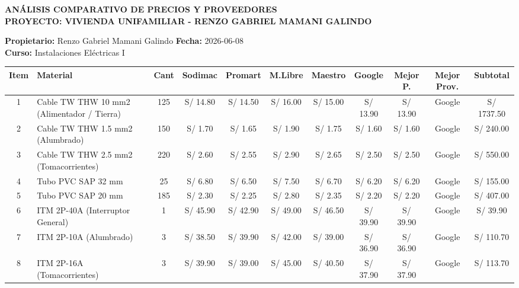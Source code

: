 \documentclass[11pt,a4paper]{article}
\begin{document}
\begin{landscape}
\begin{center}
    {\LARGE\bfseries\color{navyblue} ANÁLISIS COMPARATIVO DE PRECIOS Y PROVEEDORES}\\[0.2cm]
    {\large\bfseries PROYECTO: VIVIENDA UNIFAMILIAR - RENZO GABRIEL MAMANI GALINDO}
\end{center}

\vspace{0.4cm}
\textbf{Propietario:} Renzo Gabriel Mamani Galindo \hfill \textbf{Fecha:} 2026-06-08 \\
\textbf{Curso:} Instalaciones Eléctricas I  \\

\vspace{0.4cm}

\begin{table}[H]
\centering
\begin{scriptsize}
\begin{tabularx}{1.38\textwidth}{c X c c c c c c c c c}
\toprule
\textbf{Item} & \textbf{Material} & \textbf{Cant} & \textbf{Sodimac} & \textbf{Promart} & \textbf{M.Libre} & \textbf{Maestro} & \textbf{Google} & \textbf{Mejor P.} & \textbf{Mejor Prov.} & \textbf{Subtotal} \\
\midrule
1 & Cable TW THW 10 mm2 (Alimentador / Tierra) & 125 & S/ 14.80 & S/ 14.50 & S/ 16.00 & S/ 15.00 & S/ 13.90 & S/ 13.90 & Google & S/ 1737.50 \\
2 & Cable TW THW 1.5 mm2 (Alumbrado) & 150 & S/ 1.70 & S/ 1.65 & S/ 1.90 & S/ 1.75 & S/ 1.60 & S/ 1.60 & Google & S/ 240.00 \\
3 & Cable TW THW 2.5 mm2 (Tomacorrientes) & 220 & S/ 2.60 & S/ 2.55 & S/ 2.90 & S/ 2.65 & S/ 2.50 & S/ 2.50 & Google & S/ 550.00 \\
4 & Tubo PVC SAP 32 mm & 25 & S/ 6.80 & S/ 6.50 & S/ 7.50 & S/ 6.70 & S/ 6.20 & S/ 6.20 & Google & S/ 155.00 \\
5 & Tubo PVC SAP 20 mm & 185 & S/ 2.30 & S/ 2.25 & S/ 2.80 & S/ 2.35 & S/ 2.20 & S/ 2.20 & Google & S/ 407.00 \\
6 & ITM 2P-40A (Interruptor General) & 1 & S/ 45.90 & S/ 42.90 & S/ 49.00 & S/ 46.50 & S/ 39.90 & S/ 39.90 & Google & S/ 39.90 \\
7 & ITM 2P-10A (Alumbrado) & 3 & S/ 38.50 & S/ 39.90 & S/ 42.00 & S/ 39.00 & S/ 36.90 & S/ 36.90 & Google & S/ 110.70 \\
8 & ITM 2P-16A (Tomacorrientes) & 3 & S/ 39.90 & S/ 39.00 & S/ 45.00 & S/ 40.50 & S/ 37.90 & S/ 37.90 & Google & S/ 113.70 \\

\end{tabularx}
\end{scriptsize}
\end{table}
\end{landscape}
\end{document}
